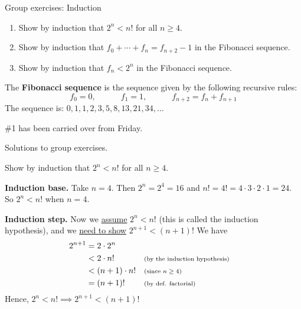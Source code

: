 \documentclass[10pt]{beamer}
\begin{document}
\begin{frame}{Group exercises: Induction}
\footnotesize 

\begin{enumerate}
\item  Show by induction that $2^n < n!$ for all $n \geq 4$.	
\item Show by induction that $f_0 + \cdots + f_n = f_{n+2} -1$ in the Fibonacci sequence.
\item Show by induction that $f_n < 2^n$ in the Fibonacci sequence. 
\end{enumerate}
\vfill 
\begin{mygreenbox}[title=Definition]
The \textbf{Fibonacci sequence} is the sequence given by the following recursive rules:
\[f_0 =0, \qquad \quad f_1 =1, \qquad \quad f_{n+2} = f_n + f_{n+1} \]
The sequence is: $0,1,1,2,3,5,8,13,21,34, \hdots$
\end{mygreenbox}
\vfill 
\begin{myyellowbox}[title=Logistics Alert]
 \#1 has been carried over from Friday.	
\end{myyellowbox}

\end{frame}

\begin{frame}[standout]
Solutions to group exercises.	
\end{frame}


\begin{frame}

\begin{mygreenbox}[title=Exercise 1]
 Show by induction that $2^n < n!$ for all $n \geq 4$.	
\end{mygreenbox}

\vfill \vfill 
\begin{myyellowbox}[title=Solution]
\textbf{Induction base.} Take $n=4$.  Then $2^n = 2^4 = 16$ and $n! = 4! = 4 \cdot 3 \cdot 2 \cdot 1 = 24$. So $2^n < n!$ when $n=4$.

\vspace{0.5cm}

\textbf{Induction step.} Now we \underline{assume} $2^n<n!$ (this is called the \alert{induction hypothesis}), and we \underline{need to show} $2^{n+1}<(n+1)!$ We have
%
\begin{align*}
2^{n+1} &= 2 \cdot 2^n \\
&< 2 \cdot n! && \text{\scriptsize{{(by the induction hypothesis)}}} \\
&< (n+1) \cdot n! && \text{\scriptsize{{(since $n \geq 4$)}}} \\
&= (n+1)! && \text{\scriptsize{{(by def. factorial)}}}	
\end{align*}
Hence, $2^n<n! \implies 2^{n+1}<(n+1)!$
\end{myyellowbox}
\end{frame}
\end{document}
